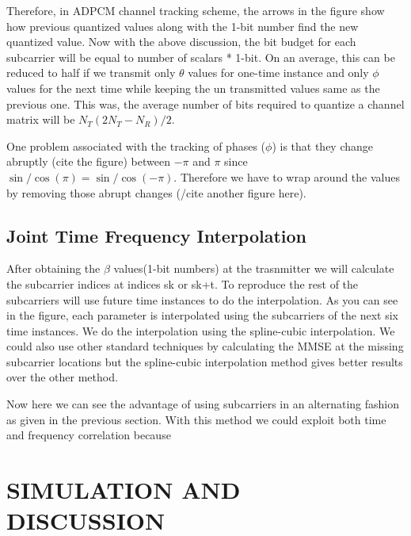 \documentclass[conference]{IEEEtran}
\begin{document}
Therefore, in ADPCM channel tracking scheme, the arrows in the figure show how previous quantized values along with the 1-bit number find the new quantized value. Now with the above discussion, the bit budget for each subcarrier will be equal to number of scalars * 1-bit. On an average, this can be reduced to half if we transmit only $\theta$ values for one-time instance and only $\phi$ values for the next time while keeping the un transmitted values same as the previous one. This was, the average number of bits required to quantize a channel matrix will be $N_{T}(2N_{T} - N_{R})/2$.

One problem associated with the tracking of phases ($\phi$) is that they change abruptly (cite the figure) between $-\pi$ and $\pi$ since $\sin/\cos(\pi) =\sin/\cos(-\pi)$. Therefore we have to wrap around the values by removing those abrupt changes (/cite another figure here).


\subsection{Joint Time Frequency Interpolation}
\label{interp}

After obtaining the $\beta$ values(1-bit numbers) at the trasnmitter we will calculate the subcarrier indices at indices sk or sk+t. To reproduce the rest of the subcarriers will use future time instances to do the interpolation. As you can see in the figure, each parameter is interpolated using the subcarriers of the next six time instances. We do the interpolation using the spline-cubic interpolation. We could also use other standard techniques by calculating the MMSE at the missing subcarrier locations but the spline-cubic interpolation method gives better results over the other method.

Now here we can see the advantage of using subcarriers in an alternating fashion as given in the previous section. With this method we could exploit both time and frequency correlation because


\section{SIMULATION AND DISCUSSION}
\label{section3}
\end{document}
